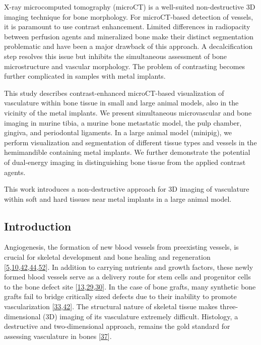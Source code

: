 X-ray microcomputed tomography (microCT) is a well-suited non-destructive 3D imaging technique for bone morphology.
For microCT-based detection of vessels, it is paramount to use contrast enhancement.
Limited differences in radiopacity between perfusion agents and mineralized bone make their distinct segmentation problematic and have been a major drawback of this approach.
A decalcification step resolves this issue but inhibits the simultaneous assessment of bone microstructure and vascular morphology.
The problem of contrasting becomes further complicated in samples with metal implants.

This study describes contrast-enhanced microCT-based visualization of vasculature within bone tissue in small and large animal models, also in the vicinity of the metal implants.
We present simultaneous microvascular and bone imaging in murine tibia, a murine bone metastatic model, the pulp chamber, gingiva, and periodontal ligaments.
In a large animal model (minipig), we perform visualization and segmentation of different tissue types and vessels in the hemimandible containing metal implants.
We further demonstrate the potential of dual-energy imaging in distinguishing bone tissue from the applied contrast agents.

This work introduces a non-destructive approach for 3D imaging of vasculature within soft and hard tissues near metal implants in a large animal model.

\hypertarget{introduction}{%
\subsection{Introduction}\label{introduction}}

Angiogenesis, the formation of new blood vessels from preexisting vessels, is crucial for skeletal development and bone healing and regeneration {[}\protect\hyperlink{ref-1FaKEBtU8}{5},\protect\hyperlink{ref-yZTJBX1B}{10},\protect\hyperlink{ref-Vu36g0cK}{42},\protect\hyperlink{ref-AHsHFIUt}{44},\protect\hyperlink{ref-zXoIXG3G}{52}{]}.
In addition to carrying nutrients and growth factors, these newly formed blood vessels serve as a delivery route for stem cells and progenitor cells to the bone defect site {[}\protect\hyperlink{ref-5mgeUNd6}{13},\protect\hyperlink{ref-Es64ZQO}{29},\protect\hyperlink{ref-dBkW39I8}{30}{]}.
In the case of bone grafts, many synthetic bone grafts fail to bridge critically sized defects due to their inability to promote vascularization {[}\protect\hyperlink{ref-33Vq8bQx}{33},\protect\hyperlink{ref-Vu36g0cK}{42}{]}.
The structural nature of skeletal tissue makes three-dimensional (3D) imaging of its vasculature extremely difficult.
Histology, a destructive and two-dimensional approach, remains the gold standard for assessing vasculature in bones {[}\protect\hyperlink{ref-117R9ULnv}{37}{]}.

